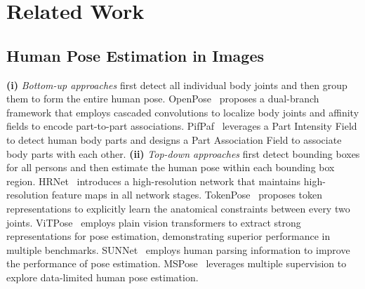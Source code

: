 \section{Related Work}
\label{sec:related}

\subsection{Human Pose Estimation in Images}
 	 \textbf{(i)} \emph{Bottom-up approaches} first detect all individual body joints and then group them to form the entire human pose. OpenPose~\cite{Cao_2017_CVPR} proposes a dual-branch framework that employs cascaded convolutions to localize body joints and affinity fields to encode part-to-part associations. PifPaf~\cite{kreiss2019pifpaf} leverages a Part Intensity Field to detect human body parts and designs a Part Association Field to associate body parts with each other. \textbf{(ii)} \emph{Top-down approaches} first detect bounding boxes for all persons and then estimate the human pose within each bounding box region. HRNet~\cite{wang2020deep} introduces a high-resolution network that maintains high-resolution feature maps in all network stages. TokenPose~\cite{li2021tokenpose} proposes token representations to explicitly learn the anatomical constraints between every two joints. ViTPose~\cite{xu2023vitpose++} employs plain vision transformers to extract strong representations for pose estimation, demonstrating superior performance in multiple benchmarks.  SUNNet~\cite{xu2021sunnet} employs human parsing information to improve the performance of pose estimation. MSPose~\cite{yuan2024multi} leverages multiple supervision to explore data-limited human pose estimation. 
 	


